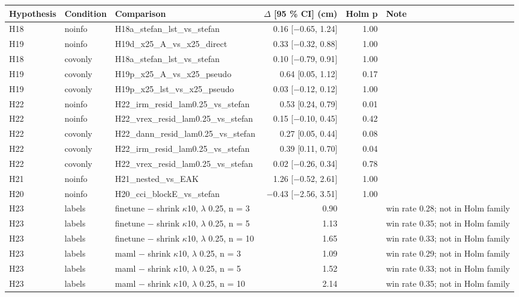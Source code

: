 \begin{tabular}{lllrrl}
\toprule
Hypothesis & Condition & Comparison & $\Delta$ [95 \% CI] (cm) & Holm p & Note \\
\midrule
H18 & noinfo & H18a\_stefan\_lst\_vs\_stefan & 0.16 [$-$0.65, 1.24] & 1.00 &  \\
H19 & noinfo & H19d\_x25\_A\_vs\_x25\_direct & 0.33 [$-$0.32, 0.88] & 1.00 &  \\
H18 & covonly & H18a\_stefan\_lst\_vs\_stefan & 0.10 [$-$0.79, 0.91] & 1.00 &  \\
H19 & covonly & H19p\_x25\_A\_vs\_x25\_pseudo & 0.64 [0.05, 1.12] & 0.17 &  \\
H19 & covonly & H19p\_x25\_lst\_vs\_x25\_pseudo & 0.03 [$-$0.12, 0.12] & 1.00 &  \\
H22 & noinfo & H22\_irm\_resid\_lam0.25\_vs\_stefan & 0.53 [0.24, 0.79] & 0.01 &  \\
H22 & noinfo & H22\_vrex\_resid\_lam0.25\_vs\_stefan & 0.15 [$-$0.10, 0.45] & 0.42 &  \\
H22 & covonly & H22\_dann\_resid\_lam0.25\_vs\_stefan & 0.27 [0.05, 0.44] & 0.08 &  \\
H22 & covonly & H22\_irm\_resid\_lam0.25\_vs\_stefan & 0.39 [0.11, 0.70] & 0.04 &  \\
H22 & covonly & H22\_vrex\_resid\_lam0.25\_vs\_stefan & 0.02 [$-$0.26, 0.34] & 0.78 &  \\
H21 & noinfo & H21\_nested\_vs\_EAK & 1.26 [$-$0.52, 2.61] & 1.00 &  \\
H20 & noinfo & H20\_cci\_blockE\_vs\_stefan & $-$0.43 [$-$2.56, 3.51] & 1.00 &  \\
H23 & labels & finetune $-$ shrink $\kappa$10, $\lambda$ 0.25, n = 3 & 0.90 &  & win rate 0.28; not in Holm family \\
H23 & labels & finetune $-$ shrink $\kappa$10, $\lambda$ 0.25, n = 5 & 1.13 &  & win rate 0.35; not in Holm family \\
H23 & labels & finetune $-$ shrink $\kappa$10, $\lambda$ 0.25, n = 10 & 1.65 &  & win rate 0.33; not in Holm family \\
H23 & labels & maml $-$ shrink $\kappa$10, $\lambda$ 0.25, n = 3 & 1.09 &  & win rate 0.29; not in Holm family \\
H23 & labels & maml $-$ shrink $\kappa$10, $\lambda$ 0.25, n = 5 & 1.52 &  & win rate 0.33; not in Holm family \\
H23 & labels & maml $-$ shrink $\kappa$10, $\lambda$ 0.25, n = 10 & 2.14 &  & win rate 0.35; not in Holm family \\

\end{tabular}
